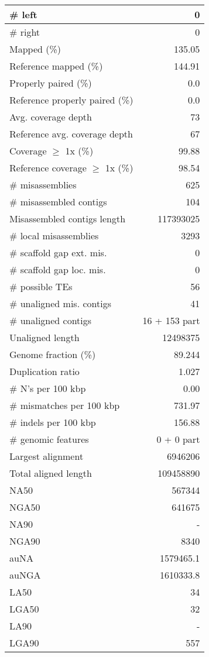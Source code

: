 \documentclass[12pt,a4paper]{article}
\begin{document}
\begin{table}[ht]
\begin{center}
\begin{tabular}{|l*{1}{|r}|}
\# left & 0 \\ \hline
\# right & 0 \\ \hline
Mapped (\%) & 135.05 \\ \hline
Reference mapped (\%) & 144.91 \\ \hline
Properly paired (\%) & 0.0 \\ \hline
Reference properly paired (\%) & 0.0 \\ \hline
Avg. coverage depth & 73 \\ \hline
Reference avg. coverage depth & 67 \\ \hline
Coverage $\geq$ 1x (\%) & 99.88 \\ \hline
Reference coverage $\geq$ 1x (\%) & 98.54 \\ \hline
\# misassemblies & 625 \\ \hline
\# misassembled contigs & 104 \\ \hline
Misassembled contigs length & 117393025 \\ \hline
\# local misassemblies & 3293 \\ \hline
\# scaffold gap ext. mis. & 0 \\ \hline
\# scaffold gap loc. mis. & 0 \\ \hline
\# possible TEs & 56 \\ \hline
\# unaligned mis. contigs & 41 \\ \hline
\# unaligned contigs & 16 + 153 part \\ \hline
Unaligned length & 12498375 \\ \hline
Genome fraction (\%) & 89.244 \\ \hline
Duplication ratio & 1.027 \\ \hline
\# N's per 100 kbp & 0.00 \\ \hline
\# mismatches per 100 kbp & 731.97 \\ \hline
\# indels per 100 kbp & 156.88 \\ \hline
\# genomic features & 0 + 0 part \\ \hline
Largest alignment & 6946206 \\ \hline
Total aligned length & 109458890 \\ \hline
NA50 & 567344 \\ \hline
NGA50 & 641675 \\ \hline
NA90 & - \\ \hline
NGA90 & 8340 \\ \hline
auNA & 1579465.1 \\ \hline
auNGA & 1610333.8 \\ \hline
LA50 & 34 \\ \hline
LGA50 & 32 \\ \hline
LA90 & - \\ \hline
LGA90 & 557 \\ \hline
\end{tabular}
\end{center}
\end{table}
\end{document}
